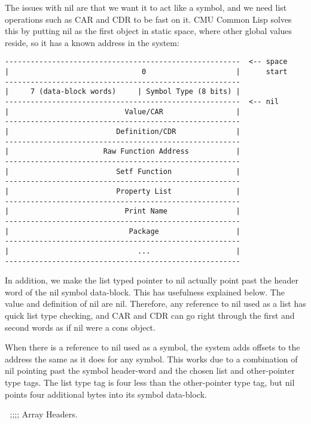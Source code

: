 The issues with nil are that we want it to act like a symbol, and we need list
operations such as CAR and CDR to be fast on it.  CMU Common Lisp solves this
by putting nil as the first object in static space, where other global values
reside, so it has a known address in the system:
\begin{verbatim}
-------------------------------------------------------  <-- space
|                               0                     |      start
-------------------------------------------------------
|     7 (data-block words)     | Symbol Type (8 bits) |
-------------------------------------------------------  <-- nil
|                           Value/CAR                 |
-------------------------------------------------------
|                         Definition/CDR              |
-------------------------------------------------------
|                      Raw Function Address           |
-------------------------------------------------------
|                         Setf Function               |
-------------------------------------------------------
|                         Property List               |
-------------------------------------------------------
|                           Print Name                |
-------------------------------------------------------
|                            Package                  |
-------------------------------------------------------
|                              ...                    |
-------------------------------------------------------
\end{verbatim}
In addition, we make the list typed pointer to nil actually point past the
header word of the nil symbol data-block.  This has usefulness explained below.
The value and definition of nil are nil.  Therefore, any reference to nil used
as a list has quick list type checking, and CAR and CDR can go right through
the first and second words as if nil were a cons object.

When there is a reference to nil used as a symbol, the system adds offsets to
the address the same as it does for any symbol.  This works due to a
combination of nil pointing past the symbol header-word and the chosen list and
other-pointer type tags.  The list type tag is four less than the other-pointer
type tag, but nil points four additional bytes into its symbol data-block.



;;;; Array Headers.

